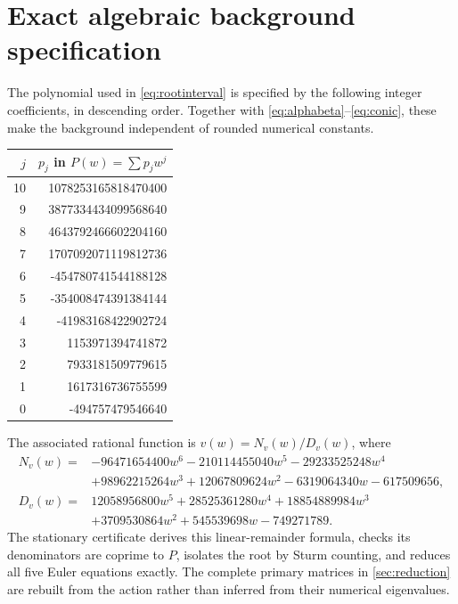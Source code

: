 \section{Exact algebraic background specification}
\label{app:algebra}
The polynomial used in \eqref{eq:rootinterval} is specified by the
following integer coefficients, in descending order. Together with
\eqref{eq:alphabeta}--\eqref{eq:conic}, these make the background
independent of rounded numerical constants.
\begin{center}
\begin{tabular}{rr}
\toprule
$j$ & $p_j$ in $P(w)=\sum p_jw^j$\\
\midrule
10 & 1078253165818470400\\
9 & 3877334434099568640\\
8 & 4643792466602204160\\
7 & 1707092071119812736\\
6 & -454780741544188128\\
5 & -354008474391384144\\
4 & -41983168422902724\\
3 & 1153971394741872\\
2 & 7933181509779615\\
1 & 1617316736755599\\
0 & -494757479546640\\
\bottomrule
\end{tabular}
\end{center}
The associated rational function is $v(w)=N_v(w)/D_v(w)$, where
\begin{align*}
 N_v(w)={}&-96471654400w^6-210114455040w^5-29233525248w^4\\
          &+98962215264w^3+12067809624w^2-6319064340w-617509656,\\
 D_v(w)={}&12058956800w^5+28525361280w^4+18854889984w^3\\
          &+3709530864w^2+545539698w-749271789.
\end{align*}
The stationary certificate derives this linear-remainder formula,
checks its denominators are coprime to $P$, isolates the root by Sturm
counting, and reduces all five Euler equations exactly. The complete
primary matrices in \cref{sec:reduction} are rebuilt from the action
rather than inferred from their numerical eigenvalues.

